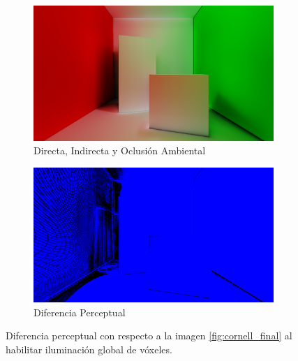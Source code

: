 \begin{figure}[H]
	\centering
	\begin{subfigure}[b]{.49\linewidth}
		\centering
		\captionsetup{justification=centering}
		\caption*{Directa, Indirecta y Oclusión Ambiental}
		\includegraphics[width=\linewidth]{media/finals/cornell_vgi.png}
	\end{subfigure}%
	\hspace{0.01\textwidth}
	\begin{subfigure}[b]{.49\linewidth}
		\centering
		\captionsetup{justification=centering}
		\caption*{Diferencia Perceptual}
		\includegraphics[width=\linewidth]{media/finals/cornell_vgi_diff.png}
	\end{subfigure}%
	\caption{Diferencia perceptual con respecto a la imagen \ref{fig:cornell_final} al habilitar iluminación global de vóxeles.}
	\label{fig:cornell_vgi_diff}
\end{figure}
